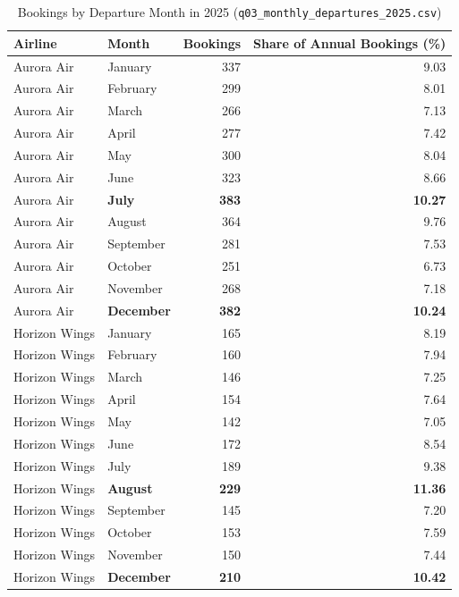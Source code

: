 \documentclass[12pt, a4paper]{report}
\newcommand{\code}[1]{\texttt{\small\color{DarkSlate}#1}}
\begin{document}
\begin{table}[H]
  \centering
  \caption{Bookings by Departure Month in 2025 (\code{q03\_monthly\_departures\_2025.csv})}
  \label{tab:q03}
  \renewcommand{\arraystretch}{1.15}
  \begin{tabular}{llrr}
    \toprule
    \rowcolor{TableHead}
    \textbf{Airline} & \textbf{Month} & \textbf{Bookings} & \textbf{Share of Annual Bookings (\%)} \\
    \midrule
    Aurora Air & January  & 337 & 9.03  \\
    \rowcolor{TableAlt}
    Aurora Air & February  & 299 & 8.01  \\
    Aurora Air & March  & 266 & 7.13  \\
    \rowcolor{TableAlt}
    Aurora Air & April  & 277 & 7.42  \\
    Aurora Air & May  & 300 & 8.04  \\
    \rowcolor{TableAlt}
    Aurora Air & June  & 323 & 8.66  \\
    Aurora Air & \textbf{July}  & \textbf{383} & \textbf{10.27} \\
    \rowcolor{TableAlt}
    Aurora Air & August  & 364 & 9.76  \\
    Aurora Air & September  & 281 & 7.53  \\
    \rowcolor{TableAlt}
    Aurora Air & October & 251 & 6.73  \\
    Aurora Air & November & 268 & 7.18  \\
    \rowcolor{TableAlt}
    Aurora Air & \textbf{December} & \textbf{382} & \textbf{10.24} \\
    \midrule
    Horizon Wings & January  & 165 & 8.19  \\
    \rowcolor{TableAlt}
    Horizon Wings & February  & 160 & 7.94  \\
    Horizon Wings & March  & 146 & 7.25  \\
    \rowcolor{TableAlt}
    Horizon Wings & April  & 154 & 7.64  \\
    Horizon Wings & May  & 142 & 7.05  \\
    \rowcolor{TableAlt}
    Horizon Wings & June  & 172 & 8.54  \\
    Horizon Wings & July  & 189 & 9.38  \\
    \rowcolor{TableAlt}
    Horizon Wings & \textbf{August}  & \textbf{229} & \textbf{11.36} \\
    Horizon Wings & September  & 145 & 7.20  \\
    \rowcolor{TableAlt}
    Horizon Wings & October & 153 & 7.59  \\
    Horizon Wings & November & 150 & 7.44  \\
    \rowcolor{TableAlt}
    Horizon Wings & \textbf{December} & \textbf{210} & \textbf{10.42} \\
    \bottomrule
  \end{tabular}
\end{table}
\end{document}
